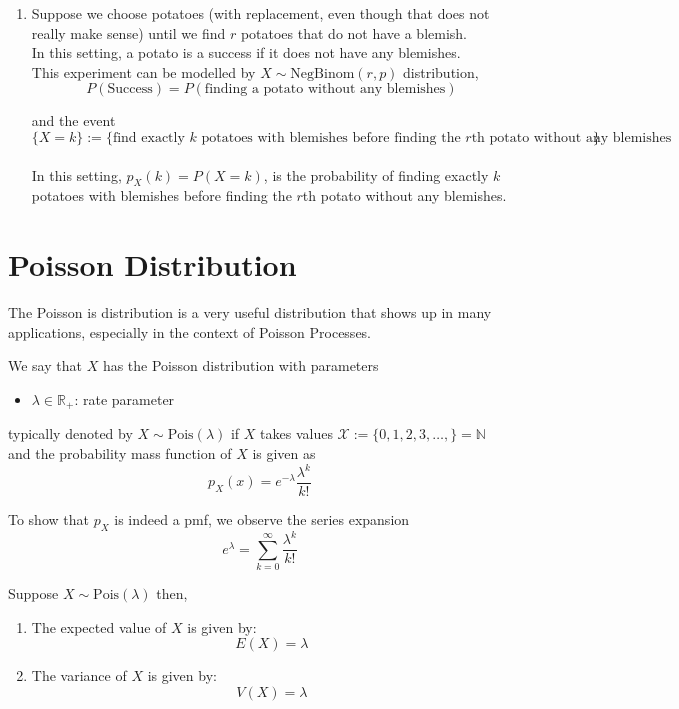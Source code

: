 \begin{enumerate}
    \item  Suppose we choose potatoes (with replacement, even though that does not really make sense) until we find $r$ potatoes that do not have a blemish. 
    \\
    
    In this setting, a potato is a success if it does not have any blemishes. 
    \\
    This experiment can be modelled by $X\sim \text{NegBinom}(r, p)$ distribution, 
    $$P(\text{Success}) = P(\text{finding a potato without any blemishes})$$
    
    and the event 
    $$\{X=k\} := \{\text{find exactly $k$ potatoes with blemishes before finding the $r$th potato without any blemishes}\}$$
    \\
    In this setting, $p_X(k) = P(X=k)$, is the probability of finding exactly $k$ potatoes with blemishes before finding the $r$th potato without any blemishes. 
\end{enumerate}


\section{Poisson Distribution}
The Poisson is distribution is a very useful distribution that shows up in many applications, especially in the context of Poisson Processes. 

\begin{defn}
    We say that $X$ has the Poisson  distribution with parameters
    \begin{itemize}
    \item $\lambda \in \mathbb{R}_{+}$: rate parameter
    \end{itemize}
    typically denoted by $X \sim \text{Pois}(\lambda)$ if $X$ takes values $\mathcal{X}:= \{0, 1, 2, 3, \dots, \} = \mathbb{N}$ and the probability mass function of $X$ is given as
    $$p_X(x) = e^{-\lambda} \frac{\lambda^k}{k!}$$
\end{defn}

To show that $p_X$ is indeed a pmf, we observe the series expansion 
$$e^{\lambda}= \sum_{k=0}^\infty \frac{\lambda^k}{k!}$$

\begin{thm}
    Suppose $X\sim \text{Pois}(\lambda)$ then,
    \begin{enumerate}
        \item The expected value of $X$ is given by:
        $$E(X) = \lambda$$
        \item The variance of $X$ is given by:
        $$V(X) = \lambda$$
    \end{enumerate}
\end{thm}



